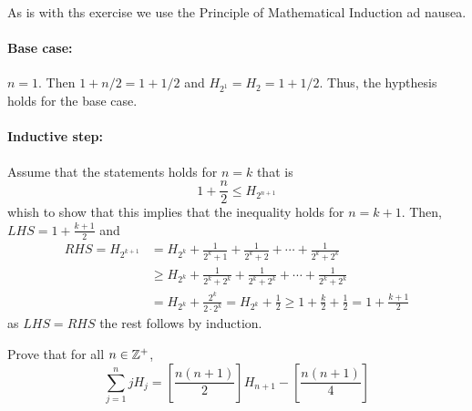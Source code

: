 \documentclass[a4paper, english, 12pt]{article} %
\newcommand{\solutions}{true} %
\begin{document}
\begin{answer}
  As is with ths exercise we use the Principle of Mathematical Induction
  ad nausea. \paragraph{Base case:} $n=1$. Then $1 + n/2 = 1 + 1/2$ and $H_{2^1} = H_2
  = 1 + 1/2$. Thus, the hypthesis holds for the base case.
  \paragraph{Inductive step:} Assume that the statements holds for $n=k$ that is
  \begin{equation*}
    1 + \frac{n}{2} \leq H_{2^{n+1}}
  \end{equation*}
  whish to show that this implies that the inequality holds for $n=k+1$. Then,
  $LHS = 1 + \frac{k+1}{2}$ and
  \begin{align*}
    RHS = H_{2^{k+1}}
    & = H_{2^k} + \frac{1}{2^k+1} + \frac{1}{2^k + 2} + \cdots + \frac{1}{2^k + 2^k} \\
    & \geq H_{2^k} + \frac{1}{2^k+2^k} + \frac{1}{2^k + 2^k} + \cdots + \frac{1}{2^k + 2^k} \\
    & = H_{2^k} + \frac{2^k}{2 \cdot 2^k}
      = H_{2^{k}} + \frac{1}{2}
      \geq 1 + \frac{k}{2} + \frac{1}{2} = 1 + \frac{k+1}{2}
  \end{align*}
  as $LHS = RHS$ the rest follows by induction. 
\end{answer}

\ifthenelse{\boolean{\solutions}}{\newpage}{}

\begin{subproblem}
  Prove that for all $n \in \mathbb{Z}^+$,
  \begin{equation*}
    \sum_{j=1}^n j H_j
    = \left[ \frac{n(n+1)}{2} \right] H_{n+1} - \left[ \frac{n(n+1)}{4} \right]
  \end{equation*}
\end{subproblem}
\end{document}
